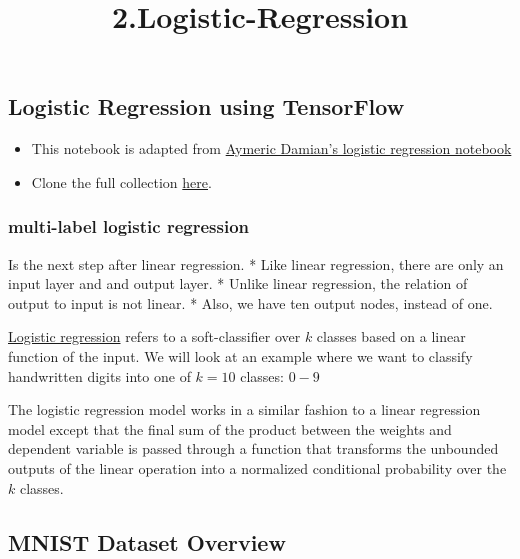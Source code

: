\documentclass[11pt]{article}
\title{2.Logistic-Regression}
\begin{document}
    
    
    \maketitle
    
    

    
    \subsection{Logistic Regression using
TensorFlow}\label{logistic-regression-using-tensorflow}

\begin{itemize}
\item
  This notebook is adapted from
  \href{https://github.com/aymericdamien/TensorFlow-Examples/blob/master/notebooks/2_BasicModels/logistic_regression.ipynb}{Aymeric
  Damian's logistic regression notebook}
\item
  Clone the full collection
  \href{https://github.com/aymericdamien/TensorFlow-Examples}{here}.
\end{itemize}

    \subsubsection{multi-label logistic
regression}\label{multi-label-logistic-regression}

Is the next step after linear regression. * Like linear regression,
there are only an input layer and and output layer. * Unlike linear
regression, the relation of output to input is not linear. * Also, we
have ten output nodes, instead of one.

    \href{https://en.wikipedia.org/wiki/Logistic_regression}{Logistic
regression} refers to a soft-classifier over \(k\) classes based on a
linear function of the input. We will look at an example where we want
to classify handwritten digits into one of \(k=10\) classes: \(0-9\)

The logistic regression model works in a similar fashion to a linear
regression model except that the final sum of the product between the
weights and dependent variable is passed through a function that
transforms the unbounded outputs of the linear operation into a
normalized conditional probability over the \(k\) classes.

    \subsection{MNIST Dataset Overview}\label{mnist-dataset-overview}
\end{document}
